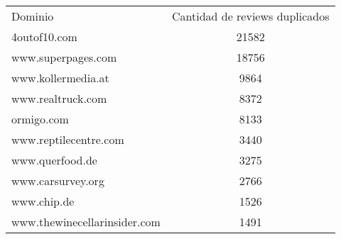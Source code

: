 \begin{tabular}{| l | c | }
Dominio & Cantidad de reviews duplicados \\
4outof10.com &	21582\\
www.superpages.com &	18756\\
www.kollermedia.at &	9864\\
www.realtruck.com &	8372\\
ormigo.com &	8133\\
www.reptilecentre.com &	3440\\
www.querfood.de &	3275\\
www.carsurvey.org &	2766\\
www.chip.de &	1526\\
www.thewinecellarinsider.com &	1491\\
\end{tabular}






